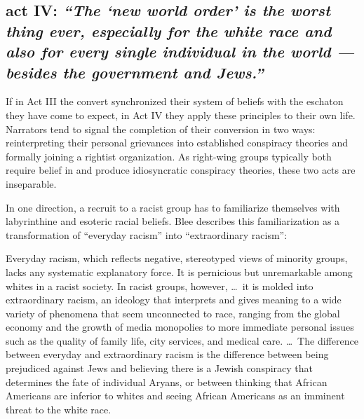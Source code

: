 \documentclass[11pt]{article}
\begin{document}
\subsection*{act IV: {\itshape ``The `new world order' is the worst thing ever, especially for the white race and also for every single individual in the world --- besides the government and Jews.''}\autocite[94]{Bl02}}

If in Act III the convert synchronized their system of beliefs with the eschaton they have come to expect, in Act IV they apply these principles to their own life. Narrators tend to signal the completion of their conversion in two ways: reinterpreting their personal grievances into established conspiracy theories and formally joining a rightist organization. As right-wing groups typically both require belief in and produce idiosyncratic conspiracy theories, these two acts are inseparable. 

In one direction, a recruit to a racist group has to familiarize themselves with labyrinthine and esoteric racial beliefs. Blee describes this familiarization as a transformation of ``everyday racism'' into ``extraordinary racism'':
\begin{displayquote}
    Everyday racism, which reflects negative, stereotyped views of minority groups, lacks any systematic explanatory force. It is pernicious but unremarkable among whites in a racist society. In racist groups, however, \dots\ it is molded into extraordinary racism, an ideology that interprets and gives meaning to a wide variety of phenomena that seem unconnected to race, ranging from the global economy and the growth of media monopolies to more immediate personal issues such as the quality of family life, city services, and medical care. \dots\ The difference between everyday and extraordinary racism is the difference between being prejudiced against Jews and believing there is a Jewish conspiracy that determines the fate of individual Aryans, or between thinking that African Americans are inferior to whites and seeing African Americans as an imminent threat to the white race.\autocite[75]{Bl02}
\end{displayquote}
\end{document}

